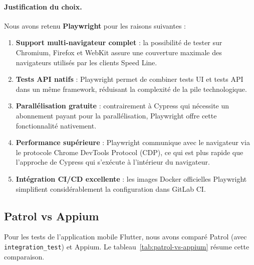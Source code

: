 \paragraph{Justification du choix.}
Nous avons retenu \textbf{Playwright} pour les raisons suivantes :
\begin{enumerate}[nosep]
    \item \textbf{Support multi-navigateur complet} : la possibilité de tester sur Chromium, Firefox et WebKit assure une couverture maximale des navigateurs utilisés par les clients Speed Line.
    \item \textbf{Tests API natifs} : Playwright permet de combiner tests UI et tests API dans un même framework, réduisant la complexité de la pile technologique.
    \item \textbf{Parallélisation gratuite} : contrairement à Cypress qui nécessite un abonnement payant pour la parallélisation, Playwright offre cette fonctionnalité nativement.
    \item \textbf{Performance supérieure} : Playwright communique avec le navigateur via le protocole Chrome DevTools Protocol (CDP), ce qui est plus rapide que l'approche de Cypress qui s'exécute à l'intérieur du navigateur.
    \item \textbf{Intégration CI/CD excellente} : les images Docker officielles Playwright simplifient considérablement la configuration dans GitLab CI.
\end{enumerate}

\subsection{Patrol vs Appium}
\label{subsec:patrol-vs-appium}

Pour les tests de l'application mobile Flutter, nous avons comparé Patrol (avec \texttt{integration\_test}) et Appium. Le tableau~\ref{tab:patrol-vs-appium} résume cette comparaison.

